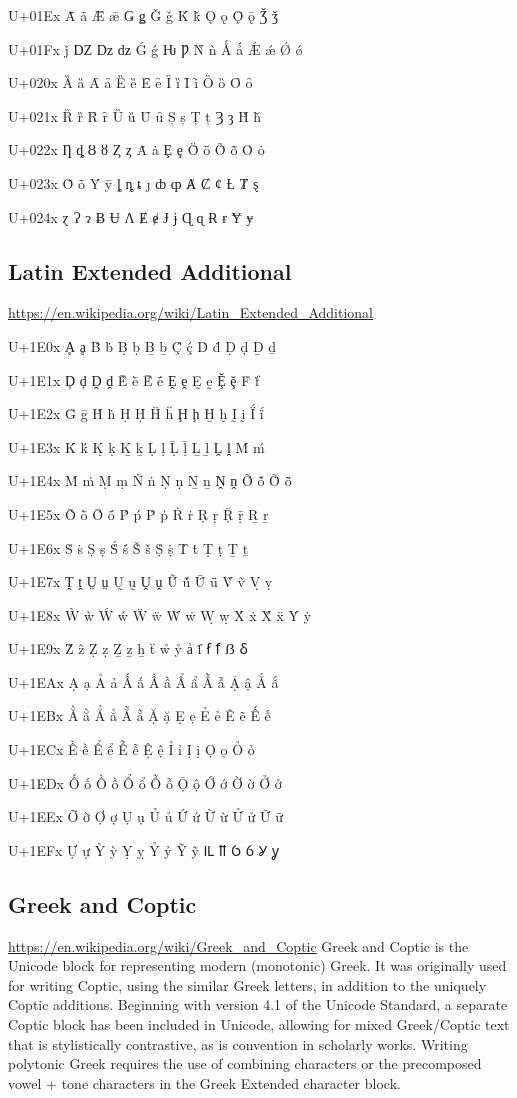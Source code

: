 U+01Ex 	Ǡ 	ǡ 	Ǣ 	ǣ 	Ǥ 	ǥ 	Ǧ 	ǧ 	Ǩ 	ǩ 	Ǫ 	ǫ 	Ǭ 	ǭ 	Ǯ 	ǯ

U+01Fx 	ǰ 	Ǳ 	ǲ 	ǳ 	Ǵ 	ǵ 	Ƕ 	Ƿ 	Ǹ 	ǹ 	Ǻ 	ǻ 	Ǽ 	ǽ 	Ǿ 	ǿ

U+020x 	Ȁ 	ȁ 	Ȃ 	ȃ 	Ȅ 	ȅ 	Ȇ 	ȇ 	Ȉ 	ȉ 	Ȋ 	ȋ 	Ȍ 	ȍ 	Ȏ 	ȏ

U+021x 	Ȑ 	ȑ 	Ȓ 	ȓ 	Ȕ 	ȕ 	Ȗ 	ȗ 	Ș 	ș 	Ț 	ț 	Ȝ 	ȝ 	Ȟ 	ȟ

U+022x 	Ƞ 	ȡ 	Ȣ 	ȣ 	Ȥ 	ȥ 	Ȧ 	ȧ 	Ȩ 	ȩ 	Ȫ 	ȫ 	Ȭ 	ȭ 	Ȯ 	ȯ

U+023x 	Ȱ 	ȱ 	Ȳ 	ȳ 	ȴ 	ȵ 	ȶ 	ȷ 	ȸ 	ȹ 	Ⱥ 	Ȼ 	ȼ 	Ƚ 	Ⱦ 	ȿ

U+024x 	ɀ 	Ɂ 	ɂ 	Ƀ 	Ʉ 	Ʌ 	Ɇ 	ɇ 	Ɉ 	ɉ 	Ɋ 	ɋ 	Ɍ 	ɍ 	Ɏ 	ɏ

\subsection{Latin Extended Additional}
\url{https://en.wikipedia.org/wiki/Latin_Extended_Additional}

U+1E0x 	Ḁ 	ḁ 	Ḃ 	ḃ 	Ḅ 	ḅ 	Ḇ 	ḇ 	Ḉ 	ḉ 	Ḋ 	ḋ 	Ḍ 	ḍ 	Ḏ 	ḏ

U+1E1x 	Ḑ 	ḑ 	Ḓ 	ḓ 	Ḕ 	ḕ 	Ḗ 	ḗ 	Ḙ 	ḙ 	Ḛ 	ḛ 	Ḝ 	ḝ 	Ḟ 	ḟ

U+1E2x 	Ḡ 	ḡ 	Ḣ 	ḣ 	Ḥ 	Ḥ 	Ḧ 	ḧ 	Ḩ 	ḩ 	Ḫ 	ḫ 	Ḭ 	ḭ 	Ḯ 	ḯ

U+1E3x 	Ḱ 	ḱ 	Ḳ 	ḳ 	Ḵ 	ḵ 	Ḷ 	ḷ 	Ḹ 	ḹ 	Ḻ 	ḻ 	Ḽ 	ḽ 	Ḿ 	ḿ

U+1E4x 	Ṁ 	ṁ 	Ṃ 	ṃ 	Ṅ 	ṅ 	Ṇ 	ṇ 	Ṉ 	ṉ 	Ṋ 	ṋ 	Ṍ 	ṍ 	Ṏ 	ṏ

U+1E5x 	Ṑ 	ṑ 	Ṓ 	ṓ 	Ṕ 	ṕ 	Ṗ 	ṗ 	Ṙ 	ṙ 	Ṛ 	ṛ 	Ṝ 	ṝ 	Ṟ 	ṟ

U+1E6x 	Ṡ 	ṡ 	Ṣ 	ṣ 	Ṥ 	ṥ 	Ṧ 	ṧ 	Ṩ 	ṩ 	Ṫ 	ṫ 	Ṭ 	ṭ 	Ṯ 	ṯ

U+1E7x 	Ṱ 	ṱ 	Ṳ 	ṳ 	Ṵ 	ṵ 	Ṷ 	ṷ 	Ṹ 	ṹ 	Ṻ 	ṻ 	Ṽ 	ṽ 	Ṿ 	ṿ

U+1E8x 	Ẁ 	ẁ 	Ẃ 	ẃ 	Ẅ 	ẅ 	Ẇ 	ẇ 	Ẉ 	ẉ 	Ẋ 	ẋ 	Ẍ 	ẍ 	Ẏ 	ẏ

U+1E9x 	Ẑ 	ẑ 	Ẓ 	ẓ 	Ẕ 	ẕ 	ẖ 	ẗ 	ẘ 	ẙ 	ẚ 	ẛ 	ẜ 	ẝ 	ẞ 	ẟ

U+1EAx 	Ạ 	ạ 	Ả 	ả 	Ấ 	ấ 	Ầ 	ầ 	Ẩ 	ẩ 	Ẫ 	ẫ 	Ậ 	ậ 	Ắ 	ắ

U+1EBx 	Ằ 	ằ 	Ẳ 	ẳ 	Ẵ 	ẵ 	Ặ 	ặ 	Ẹ 	ẹ 	Ẻ 	ẻ 	Ẽ 	ẽ 	Ế 	ế

U+1ECx 	Ề 	ề 	Ể 	ể 	Ễ 	ễ 	Ệ 	ệ 	Ỉ 	ỉ 	Ị 	ị 	Ọ 	ọ 	Ỏ 	ỏ

U+1EDx 	Ố 	ố 	Ồ 	ồ 	Ổ 	ổ 	Ỗ 	ỗ 	Ộ 	ộ 	Ớ 	ớ 	Ờ 	ờ 	Ở 	ở

U+1EEx 	Ỡ 	ỡ 	Ợ 	ợ 	Ụ 	ụ 	Ủ 	ủ 	Ứ 	ứ 	Ừ 	ừ 	Ử 	ử 	Ữ 	ữ

U+1EFx 	Ự 	ự 	Ỳ 	ỳ 	Ỵ 	ỵ 	Ỷ 	ỷ 	Ỹ 	ỹ 	Ỻ 	ỻ 	Ỽ 	ỽ 	Ỿ 	ỿ

\subsection{Greek and Coptic}
\url{https://en.wikipedia.org/wiki/Greek_and_Coptic}
Greek and Coptic is the Unicode block for representing modern (monotonic) Greek. It was originally used for writing Coptic, using the similar Greek letters, in addition to the uniquely Coptic additions. Beginning with version 4.1 of the Unicode Standard, a separate Coptic block has been included in Unicode, allowing for mixed Greek/Coptic text that is stylistically contrastive, as is convention in scholarly works. Writing polytonic Greek requires the use of combining characters or the precomposed vowel + tone characters in the Greek Extended character block.

